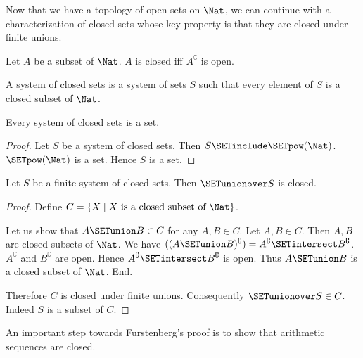 \documentclass{article}
\newcommand{\N}{\mathrm{N}}
\begin{document}
  Now that we have a topology of open sets on $\Nat$, we can continue
  with a characterization of closed sets whose key property is that they are
  closed under finite unions.

  \begin{forthel}
    \begin{definition}
      Let $A$ be a subset of $\Nat$.
      $A$ is closed iff $A^\complement$ is open.
    \end{definition}

    \begin{definition}
      A system of closed sets is a system of sets $S$ such that every element of
      $S$ is a closed subset of $\Nat$.
    \end{definition}

    \begin{lemma}
      Every system of closed sets is a set.
    \end{lemma}
    \begin{proof}
      Let $S$ be a system of closed sets.
      Then $S \SETinclude \SETpow(\Nat)$.
      $\SETpow(\Nat)$ is a set.
      Hence $S$ is a set.
    \end{proof}

    \begin{lemma}
      Let $S$ be a finite system of closed sets.
      Then $\SETunionover S$ is closed.
    \end{lemma}
    \begin{proof}
      Define $C = \{ X \mid X \text{ is a closed subset of } \Nat \}$.

      Let us show that $A \SETunion B \in C$ for any $A, B \in C$.
        Let $A, B \in C$.
        Then $A, B$ are closed subsets of $\Nat$.
        We have $((A \SETunion B)^\complement) = A^\complement \SETintersect B^\complement$. %
        $A^\complement$ and $B^\complement$ are open.
        Hence $A^\complement \SETintersect B^\complement$ is open.
        Thus $A \SETunion B$ is a closed subset of $\Nat$.
      End.

      Therefore $C$ is closed under finite unions.
      Consequently $\SETunionover S \in C$.
      Indeed $S$ is a subset of $C$.
    \end{proof}
  \end{forthel}

  An important step towards Furstenberg's proof is to show that arithmetic
  sequences are closed.

  \begin{forthel}
    \begin{lemma}
      $\N_{n, q}$ is closed.
    \end{lemma}
    \begin{proof}
      Let $m \in (\N_{n, q})^\complement$.

      Let us show that $\N_{m, q} \SETinclude (\N_{n, q})^\complement$.
        Let $k \in \N_{m, q}$.
        Assume $k \notin (\N_{n, q})^\complement$.
        Then $\NATcong{k}{m}{q}$ and $\NATcong{n}}{k}{q}$.
        Hence $\NATcong{m}{n}{q}$.
        Therefore $m \in \N_{n, q}$.
        Contradiction.
      End.
    \end{proof}
  \end{forthel}
\end{document}
